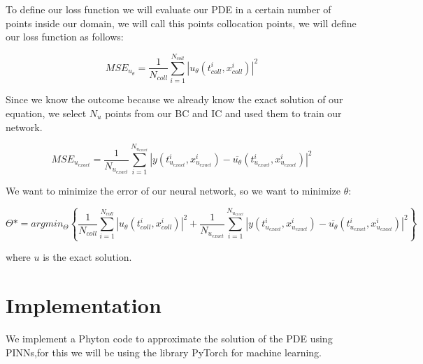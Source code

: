 \documentclass{article}
\begin{document}
To define our loss function we will evaluate our PDE in a certain number of points inside our domain, we will call this points collocation points, we will define our loss function as follows:

$$MSE_{u_\theta}=\frac{1}{N_{coll}}\sum^{N_{coll}}_{i=1}|u_\theta(t_{coll}^i,x_{coll}^i)|^2$$

Since we know the outcome because we already know the exact solution of our equation, we select $N_u$ points from our BC and IC and used them to train our network.

$$MSE_{u_{exact}}=\frac{1}{N_{u_{exact}}}\sum^{N_{u_{exact}}}_{i=1}|y(t_{u_{exact}}^i,x_{u_{exact}}^i)-\overline{u_\theta}(t_{u_{exact}}^i,x_{u_{exact}}^i)|^2$$

We want to minimize the error of our neural network, so we want to minimize $\theta$:

$$
\Theta* = argmin_\Theta \left\{ \frac{1}{N_{coll}}\sum^{N_{coll}}_{i=1}|u_\theta(t_{coll}^i,x_{coll}^i)|^2 + \frac{1}{N_{u_{exact}}}\sum^{N_{u_{exact}}}_{i=1}|y(t_{u_{exact}}^i,x_{u_{exact}}^i)-\overline{u_\theta}(t_{u_{exact}}^i,x_{u_{exact}}^i)|^2 \right\}
$$

where $u$ is the exact solution.

\section{Implementation}
We implement a Phyton code to approximate the solution of the PDE using PINNs,for this we will be using the library PyTorch for machine learning.
\end{document}
